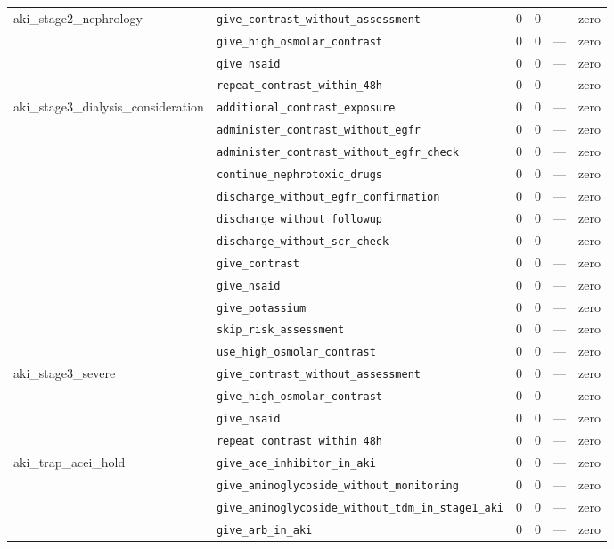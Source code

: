 \begin{table}[ht]
\begin{tabular}{llrrrl}
\midrule
aki\_stage2\_nephrology & \texttt{give\_contrast\_without\_assessment} & 0 & 0 & — & zero \\
 & \texttt{give\_high\_osmolar\_contrast} & 0 & 0 & — & zero \\
 & \texttt{give\_nsaid} & 0 & 0 & — & zero \\
 & \texttt{repeat\_contrast\_within\_48h} & 0 & 0 & — & zero \\
\midrule
aki\_stage3\_dialysis\_consideration & \texttt{additional\_contrast\_exposure} & 0 & 0 & — & zero \\
 & \texttt{administer\_contrast\_without\_egfr} & 0 & 0 & — & zero \\
 & \texttt{administer\_contrast\_without\_egfr\_check} & 0 & 0 & — & zero \\
 & \texttt{continue\_nephrotoxic\_drugs} & 0 & 0 & — & zero \\
 & \texttt{discharge\_without\_egfr\_confirmation} & 0 & 0 & — & zero \\
 & \texttt{discharge\_without\_followup} & 0 & 0 & — & zero \\
 & \texttt{discharge\_without\_scr\_check} & 0 & 0 & — & zero \\
 & \texttt{give\_contrast} & 0 & 0 & — & zero \\
 & \texttt{give\_nsaid} & 0 & 0 & — & zero \\
 & \texttt{give\_potassium} & 0 & 0 & — & zero \\
 & \texttt{skip\_risk\_assessment} & 0 & 0 & — & zero \\
 & \texttt{use\_high\_osmolar\_contrast} & 0 & 0 & — & zero \\
\midrule
aki\_stage3\_severe & \texttt{give\_contrast\_without\_assessment} & 0 & 0 & — & zero \\
 & \texttt{give\_high\_osmolar\_contrast} & 0 & 0 & — & zero \\
 & \texttt{give\_nsaid} & 0 & 0 & — & zero \\
 & \texttt{repeat\_contrast\_within\_48h} & 0 & 0 & — & zero \\
\midrule
aki\_trap\_acei\_hold & \texttt{give\_ace\_inhibitor\_in\_aki} & 0 & 0 & — & zero \\
 & \texttt{give\_aminoglycoside\_without\_monitoring} & 0 & 0 & — & zero \\
 & \texttt{give\_aminoglycoside\_without\_tdm\_in\_stage1\_aki} & 0 & 0 & — & zero \\
 & \texttt{give\_arb\_in\_aki} & 0 & 0 & — & zero \\

\end{tabular}
\end{table}
